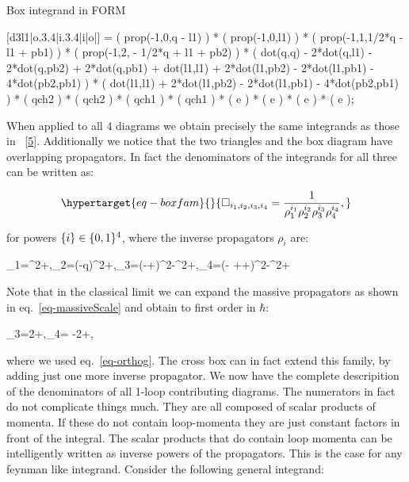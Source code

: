 \documentclass[
  11pt,
  a4paper,
  DIV=11,
  numbers=noendperiod,
  twoside]{scrreprt}
\newenvironment{Shaded}{\begin{snugshade}}{\end{snugshade}}
\newcommand{\NormalTok}[1]{\textcolor[rgb]{0.00,0.23,0.31}{#1}}
\let\[\relax \let\]\relax %
\DeclareRobustCommand{\[}{\begin{equation}}
\DeclareRobustCommand{\]}{\end{equation}}
\begin{document}
\begin{codelisting}

\caption{Box integrand in FORM}

\hypertarget{lst-formBox}{%
\label{lst-formBox}}%
\begin{Shaded}
\begin{Highlighting}[]

\NormalTok{   [d3l1|o.3.4|i.3.4|i|o|] =}
\NormalTok{         ( prop({-}1,0,q {-} l1) )}
\NormalTok{       * ( prop({-}1,0,l1) )}
\NormalTok{       * ( prop({-}1,1,1/2*q {-} l1 + pb1) )}
\NormalTok{       * ( prop({-}1,2, {-} 1/2*q + l1 + pb2) )}
\NormalTok{       * ( dot(q,q) {-} 2*dot(q,l1) {-} 2*dot(q,pb2) + 2*dot(q,pb1) + dot(l1,l1)}
\NormalTok{          + 2*dot(l1,pb2) {-} 2*dot(l1,pb1) {-} 4*dot(pb2,pb1) )}
\NormalTok{       * ( dot(l1,l1) + 2*dot(l1,pb2) {-} 2*dot(l1,pb1) {-} 4*dot(pb2,pb1) )}
\NormalTok{       * ( qch2 ) * ( qch2 ) * ( qch1 ) * ( qch1 )}
\NormalTok{       * ( e ) * ( e ) * ( e ) * ( e );}
\end{Highlighting}
\end{Shaded}

\end{codelisting}

When applied to all 4 diagrams we obtain precisely the same integrands
as those in ~{[}\protect\hyperlink{ref-Kosower:2018adc}{5}{]}.
Additionally we notice that the two triangles and the box diagram have
overlapping propagators. In fact the denominators of the integrands for
all three can be written as:

\begin{equation}\protect\hypertarget{eq-boxfam}{}{
\Box_{i_1,i_2,i_3,i_4}=\inv{\rho_1^{i_1}\rho_2^{i_2}\rho_3^{i_3}\rho_4^{i_4}},
}\label{eq-boxfam}\end{equation}

for powers \(\{i \}\in\{0,1 \}^4\), where the inverse propagators
\(\rho_i\) are:

\[
\rho_1=\ell^2+\im \epsilon,\quad \rho_2=(\ell-q)^2+\im \epsilon,\quad \rho_3=(\Half[q]-\ell+\semom[1])^2-\mass[1]^2+\im \epsilon,\quad \rho_4=(-  \Half[q]+\ell+\semom[2])^2-\mass[2]^2+\im \epsilon
\]

Note that in the classical limit we can expand the massive propagators
as shown in eq.~\ref{eq-massiveScale} and obtain to first order in
\(\hbar\):

\[
\rho_3=2\ell\cdot\semom[1]+\im \epsilon,\quad \rho_4= -2\ell\cdot\semom[2]+\im \epsilon,
\]

where we used eq.~\ref{eq-orthog}. The cross box can in fact extend this
family, by adding just one more inverse propagator. We now have the
complete descripition of the denominators of all 1-loop contributing
diagrams. The numerators in fact do not complicate things much. They are
all composed of scalar products of momenta. If these do not contain
loop-momenta they are just constant factors in front of the integral.
The scalar products that do contain loop momenta can be intelligently
written as inverse powers of the propagators. This is the case for any
feynman like integrand. Consider the following general integrand:
\end{document}
